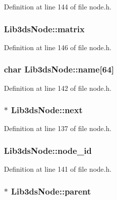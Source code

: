Definition at line 144 of file node.\-h.

\hypertarget{struct_lib3ds_node_aad674a0fa13ce79328e5917c1c20316a}{
\subsubsection[{matrix}]{ Lib3ds\-Node\-::matrix}}\label{struct_lib3ds_node_aad674a0fa13ce79328e5917c1c20316a}


Definition at line 146 of file node.\-h.

\hypertarget{struct_lib3ds_node_a3a3a3a081a477314778466609db7d436}{
\subsubsection[{name}]{\setlength{\rightskip}{0pt plus 5cm}char Lib3ds\-Node\-::name\mbox{[}64\mbox{]}}}\label{struct_lib3ds_node_a3a3a3a081a477314778466609db7d436}


Definition at line 142 of file node.\-h.

\hypertarget{struct_lib3ds_node_a29b3a346b1f5d7ae4e08ddf7f43ddcb2}{
\subsubsection[{next}]{$\ast$ Lib3ds\-Node\-::next}}\label{struct_lib3ds_node_a29b3a346b1f5d7ae4e08ddf7f43ddcb2}


Definition at line 137 of file node.\-h.

\hypertarget{struct_lib3ds_node_a2661dd2e2140d1bc64294ba97031e59d}{
\subsubsection[{node\-\_\-id}]{ Lib3ds\-Node\-::node\-\_\-id}}\label{struct_lib3ds_node_a2661dd2e2140d1bc64294ba97031e59d}


Definition at line 141 of file node.\-h.

\hypertarget{struct_lib3ds_node_a72cb6b7a1badca5b0505c4cd746fd1e0}{
\subsubsection[{parent}]{$\ast$ Lib3ds\-Node\-::parent}}\label{struct_lib3ds_node_a72cb6b7a1badca5b0505c4cd746fd1e0}


